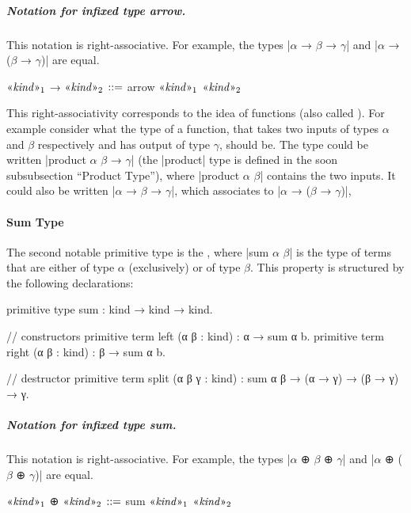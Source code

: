 \subparagraph{Notation for infixed type arrow.}
This notation is right-associative.
For example, the types \code|$α$ → $β$ → $γ$| and \code|$α$ → ($β$ → $γ$)| are equal.
\begin{program}[caption={Notation for infixed type arrow}]
$\mvar{kind}_1$ → $\mvar{kind}_2$   $\syneq$   arrow $\mvar{kind}_1$ $\mvar{kind}_2$
\end{program}
This right-associativity corresponds to the idea of  functions (also called ).
For example consider what the type of a function, that takes two inputs of types $α$ and $β$ respectively and has output of type $γ$, should be.
The type could be written \code|product $α$ $β$ → $γ$| (the \code|product| type is defined in the soon subsubsection ``Product Type''), where \code|product $α$ $β$| contains the two inputs.
It could also be written \code|$α$ → $β$ → $γ$|, which associates to \code|$α$ → ($β$ → $γ$)|,



\paragraph{Sum Type}

The second notable primitive type is the , where \code|sum $α$ $β$| is the type of terms that are either of type $α$ (exclusively) or of type $β$.
This property is structured by the following declarations:
\begin{program}[caption={Primitives for the sum type}]
primitive type sum : kind → kind → kind.

// constructors
primitive term left  (α β : kind) : α → sum α b.
primitive term right (α β : kind) : β → sum α b.

// destructor
primitive term split (α β γ : kind) : sum α β → (α → γ) → (β → γ) → γ.
\end{program}

\subparagraph{Notation for infixed type sum.}
This notation is right-associative.
For example, the types \code|$α$ ⊕ $β$ ⊕ $γ$| and \code|$α$ ⊕ ($β$ ⊕ $γ$)| are equal.
\begin{notational}[caption={Notation for infixed type sum}]
$\mvar{kind}_1$ ⊕ $\mvar{kind}_2$   $\syneq$   sum $\mvar{kind}_1$ $\mvar{kind}_2$
\end{notational}

